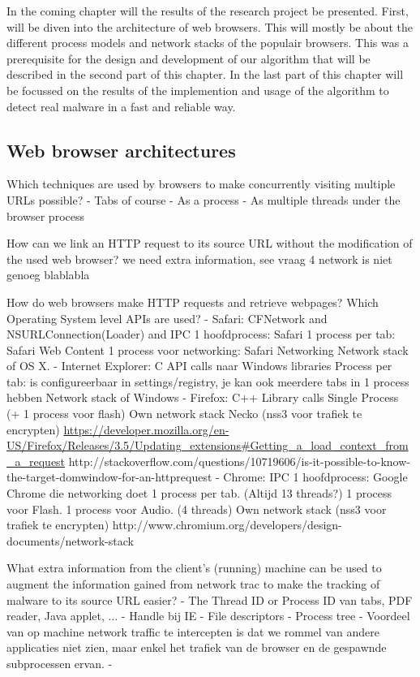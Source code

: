 In the coming chapter will the results of the research project be presented. First, will be diven into the architecture of web browsers. This will mostly be about the different process models and network stacks of the populair browsers. This was a prerequisite for the design and development of our algorithm that will be described in the second part of this chapter. In the last part of this chapter will be focussed on the results of the implemention and usage of the algorithm to detect real malware  in a fast and reliable way.

\subsection{Web browser architectures}

Which techniques are used by browsers to make concurrently visiting multiple
URLs possible?
	- Tabs of course
		- As a process
		- As multiple threads under the browser process

How can we link an HTTP request to its source URL without the modification of the used web browser?
we need extra information, see vraag 4
network is niet genoeg blablabla

How do web browsers make HTTP requests and retrieve webpages? Which Operating System level APIs are used?
	- Safari: CFNetwork and NSURLConnection(Loader) and IPC
		1 hoofdprocess: Safari
		1 process per tab: Safari Web Content
		1 process voor networking: Safari Networking
		Network stack of OS X.
	- Internet Explorer: C API calls naar Windows libraries
		Process per tab: is configureerbaar in settings/registry, je kan ook meerdere tabs in 1 process hebben
		Network stack of Windows
	- Firefox: C++ Library calls
		Single Process (+ 1 process voor flash)
		Own network stack Necko (nss3 voor trafiek te encrypten)
		\url{https://developer.mozilla.org/en-US/Firefox/Releases/3.5/Updating_extensions#Getting_a_load_context_from_a_request}
		http://stackoverflow.com/questions/10719606/is-it-possible-to-know-the-target-domwindow-for-an-httprequest
	- Chrome: IPC 
		1 hoofdprocess: Google Chrome die networking doet
		1 process per tab. (Altijd 13 threads?)
		1 process voor Flash.
		1 process voor Audio. (4 threads)
		Own network stack (nss3 voor trafiek te encrypten)
		http://www.chromium.org/developers/design-documents/network-stack

What extra information from the client's (running) machine can be used to augment the information gained from network trac to make the tracking of malware to its source URL easier?  
	- The Thread ID or Process ID van tabs, PDF reader, Java applet, ...
	- Handle bij IE
	- File descriptors
	- Process tree
	- Voordeel van op machine network traffic te intercepten is dat we rommel van andere applicaties niet zien, maar enkel het trafiek van de browser en de gespawnde subprocessen ervan.
	- 

